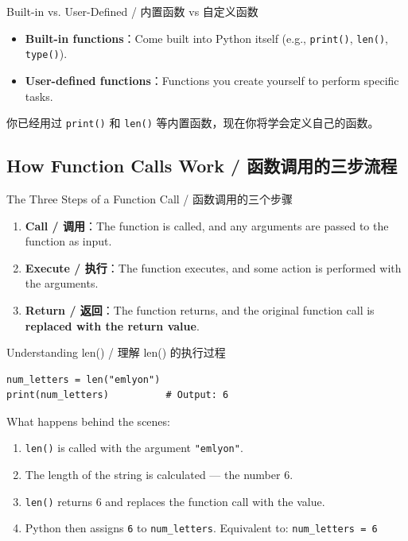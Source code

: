 \documentclass[11pt,a4paper]{article}
\begin{document}
\begin{concept}{Built-in vs. User-Defined / 内置函数 vs 自定义函数}
    \begin{itemize}[itemsep=0.3em]
        \item \textbf{Built-in functions}：Come built into Python itself (e.g., \texttt{print()}, \texttt{len()}, \texttt{type()}).
        \item \textbf{User-defined functions}：Functions you create yourself to perform specific tasks.
    \end{itemize}
    你已经用过 \texttt{print()} 和 \texttt{len()} 等内置函数，现在你将学会定义自己的函数。
\end{concept}

\subsection{How Function Calls Work / 函数调用的三步流程}

\begin{concept}{The Three Steps of a Function Call / 函数调用的三个步骤}
    \begin{enumerate}[itemsep=0.5em]
        \item \textbf{Call / 调用}：The function is called, and any arguments are passed to the function as input.
        \item \textbf{Execute / 执行}：The function executes, and some action is performed with the arguments.
        \item \textbf{Return / 返回}：The function returns, and the original function call is \textbf{replaced with the return value}.
    \end{enumerate}
\end{concept}

\begin{examplebox}{Understanding len() / 理解 len() 的执行过程}
\begin{lstlisting}
num_letters = len("emlyon")
print(num_letters)          # Output: 6
\end{lstlisting}
    What happens behind the scenes:
    \begin{enumerate}
        \item \texttt{len()} is called with the argument \texttt{"emlyon"}.
        \item The length of the string is calculated — the number 6.
        \item \texttt{len()} returns 6 and replaces the function call with the value.
        \item Python then assigns \texttt{6} to \texttt{num\_letters}. Equivalent to: \texttt{num\_letters = 6}
    \end{enumerate}
\end{examplebox}
\end{document}
